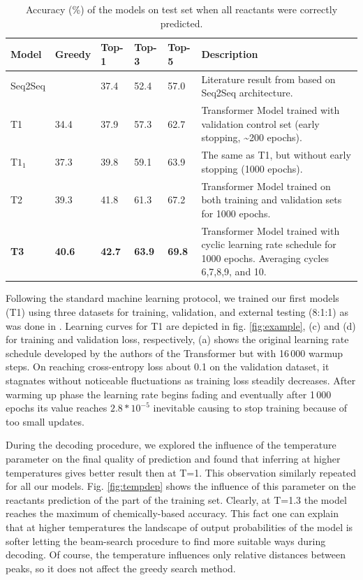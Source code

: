 \documentclass{article}
\begin{document}
\begin{table}[b!]
  \caption{Accuracy (\%) of the models on test set when all reactants were correctly predicted.}
  \centering
  \begin{tabular}{p{2cm}p{1cm}p{1cm}p{1cm}p{1cm}p{8cm}}
    \toprule
    Model & Greedy & Top-1 & Top-3 & Top-5 & Description\\
    \midrule
    Seq2Seq &  & 37.4  & 52.4 & 57.0 & Literature result from \cite{Pande} based on Seq2Seq architecture. \\ \midrule
    T1         & 34.4 & 37.9 & 57.3 & 62.7 & Transformer Model trained with validation control set (early stopping, \textasciitilde 200 epochs). \\
    T$1_1$ & 37.3 & 39.8 & 59.1 & 63.9 & The same as T1, but without early stopping (1000 epochs). \\ 
    T2         & 39.3 & 41.8 & 61.3 & 67.2 & Transformer Model trained on both training and validation sets for 1000 epochs.\\
    \textbf{T3}         & \textbf{40.6} & \textbf{42.7} & \textbf{63.9} & \textbf{69.8} & Transformer Model trained with cyclic learning rate schedule for 1000 epochs. Averaging cycles 6,7,8,9, and 10.\\
    \bottomrule
  \end{tabular}
  \label{tbl:results}
\end{table}

Following the standard machine learning protocol, we trained our first models (T1) using three datasets for training, validation, and external testing (8:1:1) as was done in \cite{Pande}. Learning curves for T1 are depicted in fig. \ref{fig:example}, (c) and (d) for training and validation loss, respectively, (a) shows the original learning rate schedule developed by the authors of the Transformer but with 16\,000 warmup steps. On reaching cross-entropy loss about 0.1 on the validation dataset, it stagnates without noticeable fluctuations as training loss steadily decreases. After warming up phase the learning rate begins fading and eventually after 1\,000 epochs its value reaches $2.8*10^{-5}$ inevitable causing to stop training because of too small updates. 

During the decoding procedure, we explored the influence of the temperature parameter on the final quality of prediction and found that inferring at higher temperatures gives better result then at T=1. This observation similarly repeated for all our models. Fig. \ref{fig:tempdep} shows the influence of this parameter on the reactants prediction of the part of the training set. Clearly, at T=1.3 the model reaches the maximum of chemically-based accuracy. This fact one can explain that at higher temperatures the landscape of output probabilities of the model is softer letting the beam-search procedure to find more suitable ways during decoding. Of course, the temperature influences only relative distances between peaks, so it does not affect the greedy search method. 
\end{document}
